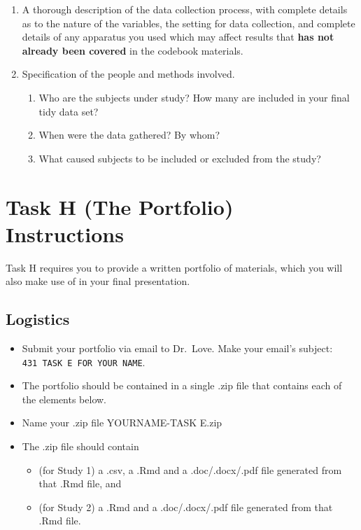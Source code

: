 \documentclass[]{book}
\providecommand{\tightlist}{%
  \setlength{\itemsep}{0pt}\setlength{\parskip}{0pt}}
\theoremstyle{definition}
\theoremstyle{definition}
\theoremstyle{definition}
\theoremstyle{remark}
\begin{document}
\begin{enumerate}
\def\labelenumi{\arabic{enumi}.}
\setcounter{enumi}{1}
\item
  A thorough description of the data collection process, with complete
  details as to the nature of the variables, the setting for data
  collection, and complete details of any apparatus you used which may
  affect results that \textbf{has not already been covered} in the
  codebook materials.
\item
  Specification of the people and methods involved.

  \begin{enumerate}
  \def\labelenumii{\alph{enumii}.}
  \tightlist
  \item
    Who are the subjects under study? How many are included in your
    final tidy data set?
  \item
    When were the data gathered? By whom?
  \item
    What caused subjects to be included or excluded from the study?
  \end{enumerate}
\end{enumerate}

\hypertarget{task-h-the-portfolio-instructions}{%
\chapter{Task H (The Portfolio)
Instructions}\label{task-h-the-portfolio-instructions}}

Task H requires you to provide a written portfolio of materials, which
you will also make use of in your final presentation.

\hypertarget{logistics}{%
\section{Logistics}\label{logistics}}

\begin{itemize}
\tightlist
\item
  Submit your portfolio via email to Dr.~Love. Make your email's
  subject: \texttt{431\ TASK\ E\ FOR\ YOUR\ NAME}.
\item
  The portfolio should be contained in a single .zip file that contains
  each of the elements below.
\item
  Name your .zip file YOURNAME-TASK E.zip
\item
  The .zip file should contain

  \begin{itemize}
  \tightlist
  \item
    (for Study 1) a .csv, a .Rmd and a .doc/.docx/.pdf file generated
    from that .Rmd file, and
  \item
    (for Study 2) a .Rmd and a .doc/.docx/.pdf file generated from that
    .Rmd file.
  \end{itemize}
\end{itemize}
\end{document}
